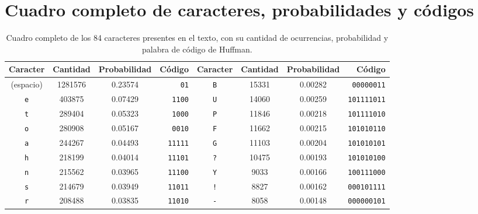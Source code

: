 \clearpage
\appendix
\section{Cuadro completo de caracteres, probabilidades y códigos}
\label{app:tabla-completa}

\begin{table}[htb!]
    \caption{Cuadro completo de los 84 caracteres presentes en el texto, con su
        cantidad de ocurrencias, probabilidad y palabra de código de Huffman.}
    \footnotesize
    \begin{tabular}{c S[table-format=7.0] S[table-format=1.5] r|c S[table-format=7.0] S[table-format=1.5] r}
        \toprule
        {Caracter} & {Cantidad} & {Probabilidad} & {Código} & {Caracter} & {Cantidad} & {Probabilidad} & {Código} \\
        \midrule
        (espacio)                 & 1281576 & 0.23574 & \texttt{01}       & \texttt{B}                & 15331   & 0.00282 & \texttt{00000011}                    \\
        \texttt{e}                & 403875  & 0.07429 & \texttt{1100}     & \texttt{U}                & 14060   & 0.00259 & \texttt{101111011}                   \\
        \texttt{t}                & 289404  & 0.05323 & \texttt{1000}     & \texttt{P}                & 11846   & 0.00218 & \texttt{101111010}                   \\
        \texttt{o}                & 280908  & 0.05167 & \texttt{0010}     & \texttt{F}                & 11662   & 0.00215 & \texttt{101010110}                   \\
        \texttt{a}                & 244267  & 0.04493 & \texttt{11111}    & \texttt{G}                & 11103   & 0.00204 & \texttt{101010101}                   \\
        \texttt{h}                & 218199  & 0.04014 & \texttt{11101}    & \texttt{?}                & 10475   & 0.00193 & \texttt{101010100}                   \\
        \texttt{n}                & 215562  & 0.03965 & \texttt{11100}    & \texttt{Y}                & 9033    & 0.00166 & \texttt{100111000}                   \\
        \texttt{s}                & 214679  & 0.03949 & \texttt{11011}    & \texttt{!}                & 8827    & 0.00162 & \texttt{000101111}                   \\
        \texttt{r}                & 208488  & 0.03835 & \texttt{11010}    & \texttt{-}                & 8058    & 0.00148 & \texttt{000000101}                   \\

\end{tabular}
\end{table}
